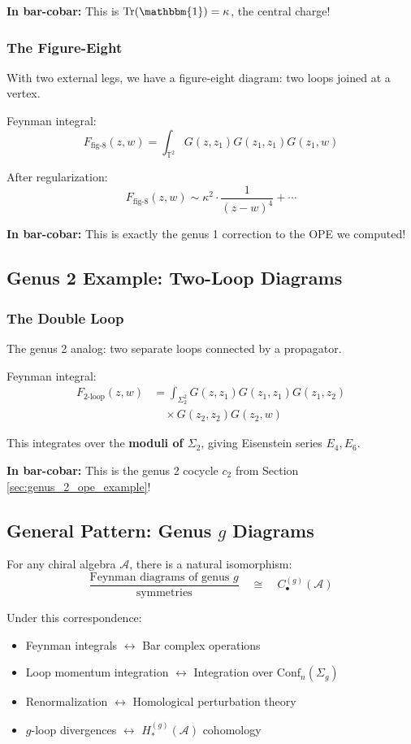 \textbf{In bar-cobar:} This is $\operatorname{Tr}(\mathbbm{1}) = \kappa$, the central charge!

\subsubsection{The Figure-Eight}

With two external legs, we have a figure-eight diagram: two loops joined at a vertex.

Feynman integral:
$$F_{\text{fig-8}}(z, w) = \int_{\mathbb{T}^2} G(z, z_1) G(z_1, z_1) G(z_1, w)$$

After regularization:
$$F_{\text{fig-8}}(z, w) \sim \kappa^2 \cdot \frac{1}{(z-w)^4} + \cdots$$

\textbf{In bar-cobar:} This is exactly the genus 1 correction to the OPE we computed!

\subsection{Genus 2 Example: Two-Loop Diagrams}

\subsubsection{The Double Loop}

The genus 2 analog: two separate loops connected by a propagator.

Feynman integral:
\begin{align}
F_{2\text{-loop}}(z, w) &= \int_{\Sigma_2^2} G(z, z_1) G(z_1, z_1) G(z_1, z_2) \\
&\quad \times G(z_2, z_2) G(z_2, w)
\end{align}

This integrates over the \textbf{moduli of $\Sigma_2$}, giving Eisenstein series $E_4, E_6$.

\textbf{In bar-cobar:} This is the genus 2 cocycle $c_2$ from Section \ref{sec:genus_2_ope_example}!

\subsection{General Pattern: Genus $g$ Diagrams}

\begin{theorem}
For any chiral algebra $\mathcal{A}$, there is a natural isomorphism:
$$\boxed{
\frac{\text{Feynman diagrams of genus }g}{\text{symmetries}}
\quad \cong \quad
C_{\bullet}^{(g)}(\mathcal{A})
}$$

Under this correspondence:
\begin{itemize}
\item Feynman integrals $\leftrightarrow$ Bar complex operations
\item Loop momentum integration $\leftrightarrow$ Integration over $\mathrm{Conf}_n(\Sigma_g)$
\item Renormalization $\leftrightarrow$ Homological perturbation theory
\item $g$-loop divergences $\leftrightarrow$ $H_*^{(g)}(\mathcal{A})$ cohomology
\end{itemize}
\end{theorem}

